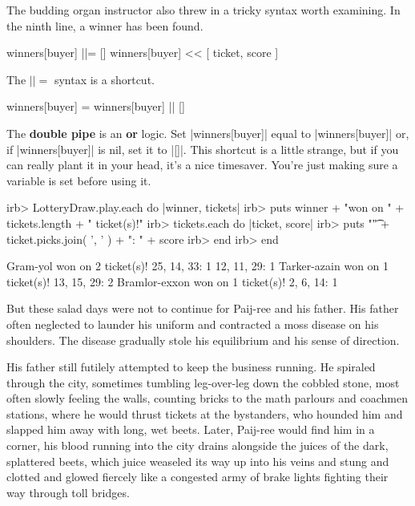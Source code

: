 \documentclass[12pt,twoside]{report}
\begin{document}
The budding organ instructor also threw in a tricky syntax worth
examining. In the ninth line, a winner has been found.


\begin{rubycode}

 winners[buyer] ||= []
 winners[buyer] << [ ticket, score ]

\end{rubycode}


The \rubyinline$||=$ syntax is a shortcut.


\begin{rubycode}

 winners[buyer] = winners[buyer] || []

\end{rubycode}


The {\bf double pipe} is an {\bf or} logic.  Set
\rubyinline|winners[buyer]| equal to
\rubyinline|winners[buyer]| or, if
\rubyinline|winners[buyer]| is nil, set it to
\rubyinline|[]|.  This shortcut is a little strange,
but if you can really plant it in your head, it's a nice timesaver.
You're just making sure a variable is set before using it.


\begin{consolecode}

 irb> LotteryDraw.play.each do |winner, tickets|
 irb>   puts winner + "won on " + tickets.length + " ticket(s)!"
 irb>   tickets.each do |ticket, score|
 irb>     puts "\t" + ticket.picks.join( ', ' ) + ": " + score
 irb>   end
 irb> end

 Gram-yol won on 2 ticket(s)!
     25, 14, 33: 1
     12, 11, 29: 1
 Tarker-azain won on 1 ticket(s)!
     13, 15, 29: 2
 Bramlor-exxon won on 1 ticket(s)!
     2, 6, 14: 1

\end{consolecode}


But these salad days were not to continue for Paij-ree and his father.
His father often neglected to launder his uniform and contracted a
moss disease on his shoulders.  The disease gradually stole his
equilibrium and his sense of direction.

His father still futilely attempted to keep the business running.  He
spiraled through the city, sometimes tumbling leg-over-leg down the
cobbled stone, most often slowly feeling the walls, counting bricks to
the math parlours and coachmen stations, where he would thrust tickets
at the bystanders, who hounded him and slapped him away with long, wet
beets.  Later, Paij-ree would find him in a corner, his blood running
into the city drains alongside the juices of the dark, splattered
beets, which juice weaseled its way up into his veins and stung and
clotted and glowed fiercely like a congested army of brake lights
fighting their way through toll bridges.
\end{document}
